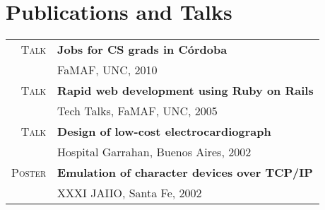 \documentclass[10pt]{article}
\begin{document}
\begin{minipage}[t]{0.44\textwidth}

\section{Publications and Talks} 

\begin{tabular}{rl}
\textsc{Talk}
& \textbf{Jobs for CS grads in Córdoba}\\
& FaMAF, UNC, 2010\\
\textsc{Talk}
& \textbf{Rapid web development using Ruby on  Rails}\\
& Tech Talks, FaMAF, UNC, 2005\\
\textsc{Talk}
& \textbf{Design of low-cost electrocardiograph}\\
& Hospital Garrahan, Buenos Aires, 2002\\
\textsc{Poster}
& \textbf{Emulation of character devices over TCP/IP}\\
& XXXI JAIIO, Santa Fe, 2002
\end{tabular}\\[10pt]

\end{minipage} %
\end{document}

